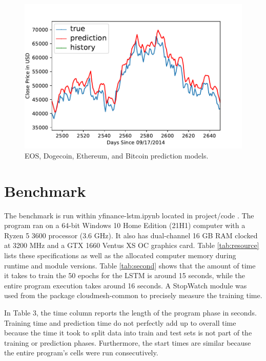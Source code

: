 \begin{figure}[p]
\begin{minipage}{.4\textwidth}
\end{minipage}
\ \
\begin{minipage}{.4\textwidth}
\includegraphics[width=1.0\textwidth]{images/BTC-USD-prediction-model-zoomed.pdf}
\end{minipage}

\caption{EOS, Dogecoin, Ethereum, and Bitcoin prediction models.}
\label{fig:other}
\end{figure}


\section{Benchmark}

The benchmark is run within yfinance-lstm.ipynb located in
project/code \cite{c13}. The program ran on a 64-bit Windows 10 Home
Edition (21H1) computer with a Ryzen 5 3600 processor (3.6 GHz). It
also has dual-channel 16 GB RAM clocked at 3200 MHz and a GTX 1660
Ventus XS OC graphics card. Table \ref{tab:resource} lists these
specifications as well as the allocated computer memory during runtime
and module versions. Table \ref{tab:second} shows that the amount of
time it takes to train the 50 epochs for the LSTM is around 15
seconds, while the entire program execution takes around 16 seconds. A
StopWatch module was used from the package cloudmesh-common \cite{c10}
to precisely measure the training time.

In Table 3, the time column reports the length of the program phase in
seconds. Training time and prediction time do not perfectly add up to
overall time because the time it took to split data into train and
test sets is not part of the training or prediction
phases. Furthermore, the start times are similar because the entire
program's cells were run consecutively.
 
